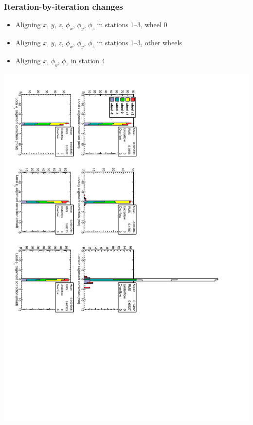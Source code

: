 \documentclass[compress]{beamer}
\begin{document}
\begin{frame}
\frametitle{Iteration-by-iteration changes}

\begin{itemize}
\item Aligning $x$, $y$, $z$, $\phi_x$, $\phi_y$, $\phi_z$ in stations 1--3, wheel 0
\item Aligning $x$, $y$, $z$, $\phi_x$, $\phi_y$, $\phi_z$ in stations 1--3, other wheels
\item Aligning $x$, $\phi_y$, $\phi_z$ in station 4
\end{itemize}

\vfill
\includegraphics[height=\linewidth, angle=90]{data_100GeV_newinternal_iter4.pdf}
\end{frame}
\end{document}
